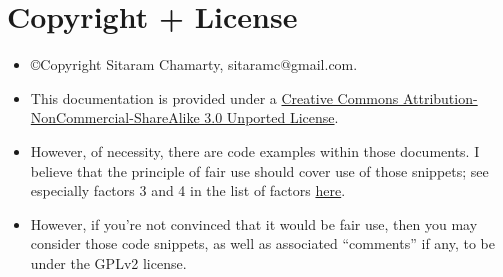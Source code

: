 \documentclass[presentation]{beamer}
\begin{document}
\section{Copyright + License}
\label{sec-11}
\begin{frame}

\begin{itemize}
\item \copyright Copyright Sitaram Chamarty, sitaramc@gmail.com.
\item This documentation is provided under a \href{http://creativecommons.org/licenses/by-nc-sa/3.0/}{Creative Commons Attribution-NonCommercial-ShareAlike 3.0 Unported License}.
\item However, of necessity, there are code examples within those documents. I believe that the principle of fair use should cover use of those snippets; see especially factors 3 and 4 in the list of factors \href{http://en.wikipedia.org/wiki/Fair_use#Fair_use_under_United_States_law}{here}.
\item However, if you're not convinced that it would be fair use, then you may consider those code snippets, as well as associated ``comments'' if any, to be under the GPLv2 license.
\end{itemize}
\end{frame}
\end{document}

